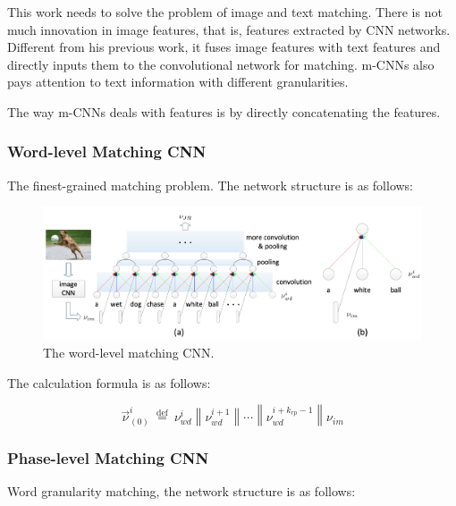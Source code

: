 This work \cite{ma2015multimodal} needs to solve the problem of image and text matching. There is not much innovation in image features, that is, features extracted by CNN networks. Different from his previous work, it fuses image features with text features and directly inputs them to the convolutional network for matching. m-CNNs also pays attention to text information with different granularities.

The way m-CNNs deals with features is by directly concatenating the features.

\subsubsection{Word-level Matching CNN}
The finest-grained matching problem. The network structure is as follows:

\begin{figure}[h!]
\centering
\includegraphics[width=\textwidth]{mccns1.pdf}
\caption{The word-level matching CNN. \cite{ma2015multimodal}}
\label{fig:mccns1}
\end{figure}

The calculation formula is as follows:

$$
\vec{\nu}_{(0)}^{i} \stackrel{\text { def }}{=} \nu_{w d}^{i}\left\|\nu_{w d}^{i+1}\right\| \cdots\left\|\nu_{w d}^{i+k_{r p}-1}\right\| \nu_{i m}
$$

\subsubsection{Phase-level Matching CNN}
Word granularity matching, the network structure is as follows:

